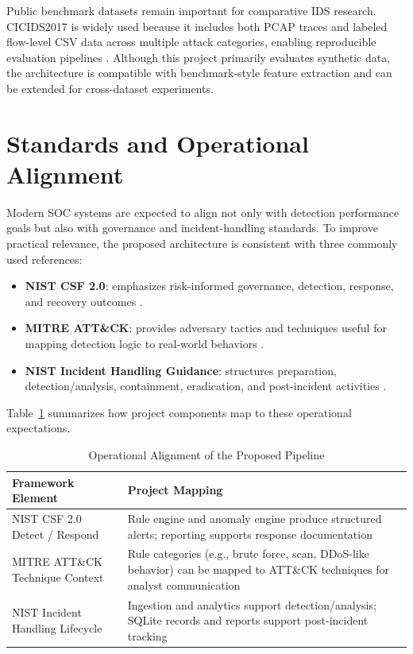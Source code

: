 \documentclass[conference]{IEEEtran}
\begin{document}
Public benchmark datasets remain important for comparative IDS research. CICIDS2017 is widely used because it includes both PCAP traces and labeled flow-level CSV data across multiple attack categories, enabling reproducible evaluation pipelines \cite{cicids2017,sharafaldin2018}. Although this project primarily evaluates synthetic data, the architecture is compatible with benchmark-style feature extraction and can be extended for cross-dataset experiments.

\section{Standards and Operational Alignment}
Modern SOC systems are expected to align not only with detection performance goals but also with governance and incident-handling standards. To improve practical relevance, the proposed architecture is consistent with three commonly used references:
\begin{itemize}
    \item \textbf{NIST CSF 2.0}: emphasizes risk-informed governance, detection, response, and recovery outcomes \cite{nistcsf20}.
    \item \textbf{MITRE ATT\&CK}: provides adversary tactics and techniques useful for mapping detection logic to real-world behaviors \cite{mitreattack}.
    \item \textbf{NIST Incident Handling Guidance}: structures preparation, detection/analysis, containment, eradication, and post-incident activities \cite{nist80061r3}.
\end{itemize}

Table~\ref{tab:alignment} summarizes how project components map to these operational expectations.

\begin{table}[h]
\centering
\caption{Operational Alignment of the Proposed Pipeline}
\label{tab:alignment}
\begin{tabular}{p{2.3cm}p{4.8cm}}
\toprule
Framework Element & Project Mapping \\
\midrule
NIST CSF 2.0 Detect / Respond & Rule engine and anomaly engine produce structured alerts; reporting supports response documentation \\
MITRE ATT\&CK Technique Context & Rule categories (e.g., brute force, scan, DDoS-like behavior) can be mapped to ATT\&CK techniques for analyst communication \\
NIST Incident Handling Lifecycle & Ingestion and analytics support detection/analysis; SQLite records and reports support post-incident tracking \\
\bottomrule
\end{tabular}
\end{table}
\end{document}
